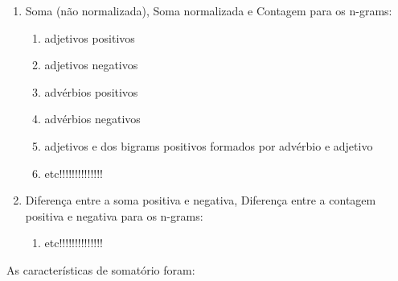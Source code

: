 \begin{enumerate}
  \item Soma (não normalizada), Soma normalizada e Contagem para os n-grams:
  \begin{enumerate}
     \item adjetivos positivos
     \item adjetivos negativos
     \item advérbios positivos
     \item advérbios negativos
     \item adjetivos e dos bigrams positivos formados por advérbio e adjetivo
     \item etc!!!!!!!!!!!!!!
  \end{enumerate}
  \item Diferença entre a soma positiva e negativa, Diferença entre a contagem positiva e negativa para os n-grams:
  \begin{enumerate}
     \item etc!!!!!!!!!!!!!!
  \end{enumerate}
\end{enumerate}

As características de somatório foram:

